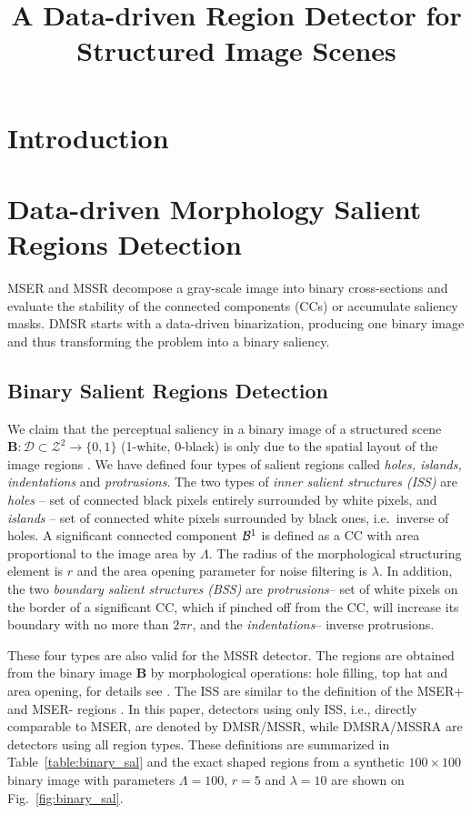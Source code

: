 \documentclass{article}
\title{A Data-driven Region Detector for Structured Image Scenes}
\def\B{{\mathbf B}}
\def\mcD{{\mathcal{D}}}
\begin{document}
\maketitle
\begin{abstract}

\end{abstract}

\section{Introduction}
\label{sec:intro}


\section{Data-driven Morphology Salient Regions Detection}
\label{sec:DMSR}

MSER and MSSR decompose a gray-scale image into binary cross-sections and evaluate the stability of the connected components (CCs) or accumulate saliency masks. DMSR starts with a data-driven binarization, producing one binary image and thus transforming the problem into a binary saliency.


\subsection{Binary Salient Regions Detection}
\label{ssec:binary}
We claim that the perceptual saliency in a binary image of a structured scene 
 $\B: \mcD \subset \mathcal{Z}^2 \rightarrow \{0,1\}$ (1-white, 0-black)
is only due to the spatial layout of the image regions \cite{RangHumpb06}. 
We have defined four types of salient regions called {\em holes, islands, indentations} and {\em protrusions}. The two types of {\em inner salient structures (ISS)} are {\em holes} -- set of connected black pixels entirely surrounded by white pixels, and {\em islands} -- set of connected white pixels surrounded by black ones, i.e.~inverse of holes. A significant connected component ${\cal B}^1$ is defined as a CC with area proportional to the image area by $\Lambda$. The radius of the morphological structuring element is $r$ and  the area opening parameter for  noise filtering is $\lambda$. In addition, the two {\em boundary salient structures (BSS)} are {\em protrusions}-- set of white pixels on the border of a significant CC, which if pinched off from the CC, will increase its boundary with no more than $2\pi r$, and the {\em indentations}-- inverse protrusions. 

These four types are also valid for the MSSR detector. The regions are obtained from the binary image $\B$ by morphological operations: hole filling, top hat and area opening, for details see \cite{RangMSSR06, RangHumpb06}. The ISS are similar to the definition of the MSER+ and MSER- regions \cite{Matas2002BMVC}. In this paper, detectors using only ISS, i.e., directly comparable to MSER, are denoted by DMSR/MSSR, while DMSRA/MSSRA are detectors using all region types. These definitions are summarized in Table~\ref{table:binary_sal} and the exact shaped regions from a synthetic $100 \times 100$ binary image with parameters $\Lambda=100$, $r=5$ and $\lambda = 10$ are shown on Fig.~\ref{fig:binary_sal}.
\end{document}
